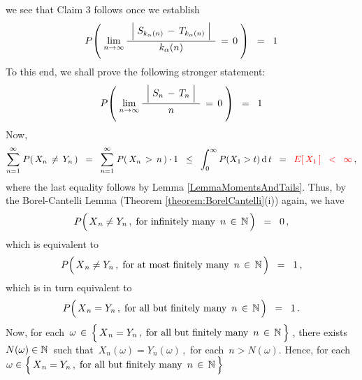 \begin{enumerate}
we see that Claim 3 follows once we establish
\begin{equation*}
P\!\left(\;
	\underset{n\rightarrow\infty}{\lim}\,
	\dfrac{{\color{white}.}
		\left\vert\;
		S_{k_{\alpha}(n)} \,\overset{{\color{white}.}}{-}\, T_{k_{\alpha}(n)}
		\;\right\vert
		{\color{white}.}}{
		k_{\alpha}(n)
		}
		\,=\, 0
	\;\right)
\;\; = \;\; 1
\end{equation*}
To this end, we shall prove the following stronger statement:
\begin{equation*}
P\!\left(\;
	\underset{n\rightarrow\infty}{\lim}\,
	\dfrac{{\color{white}.}
		\left\vert\;
		S_{n} \,\overset{{\color{white}.}}{-}\, T_{n}
		\;\right\vert
		{\color{white}.}}{
		n
		}
		\,=\, 0
	\;\right)
\;\; = \;\; 1
\end{equation*}
Now,
\begin{equation*}
\overset{\infty}{\underset{n=1}{\sum}}\;P\!\left(\,X_{n} \,\neq\, Y_{n}\,\right)
\;\; = \;\;
	\overset{\infty}{\underset{n=1}{\sum}}\;P\!\left(\,X_{n} \,>\, n\,\right) \cdot 1
\;\; \leq \;\;
	\int_{0}^{\infty}P(X_{1} > t)\,\textnormal{d}\,t
\;\; = \;\;
	{\color{red}E\!\left[\,X_{1}\,\right]
\;\; < \;\;
	\infty}\,,
\end{equation*}
where the last equality follows by Lemma \ref{LemmaMomentsAndTails}.
Thus, by the Borel-Cantelli Lemma (Theorem \ref{theorem:BorelCantelli}(i)) again, we have
\begin{equation*}
P\!\left(\,\overset{{\color{white}.}}{X}_{n} \neq Y_{n}\,,\;\textnormal{for infinitely many \,$n\,\in\,\N$}\,\right)
\;\; = \;\; 0\,,
\end{equation*}
which is equivalent to
\begin{equation*}
P\!\left(\,\overset{{\color{white}.}}{X}_{n} \neq Y_{n}\,,\;\textnormal{for at most finitely many \,$n\,\in\,\N$}\,\right)
\;\; = \;\; 1\,,
\end{equation*}
which is in turn equivalent to
\begin{equation*}
P\!\left(\,\overset{{\color{white}.}}{X}_{n} = Y_{n}\,,\;\textnormal{for all but finitely many \,$n\,\in\,\N$}\,\right)
\;\; = \;\; 1\,.
\end{equation*}
Now, for each
\,$\omega \,\in\, \left\{\,\overset{{\color{white}.}}{X}_{n} = Y_{n}\,,\;\textnormal{for all but finitely many \,$n\,\in\,\N$}\,\right\}$\,, there exists \,$N(\omega) \in \mathbb{N}$\, such that \,$X_{n}(\omega) = Y_{n}(\omega)$\,,\, for each \,$n > N(\omega)$.
Hence, for each
\,$\omega \in \left\{\,\overset{{\color{white}.}}{X}_{n} = Y_{n}\,,\;\textnormal{for all but finitely many \,$n\,\in\,\N$}\,\right\}$\,

\end{enumerate}
